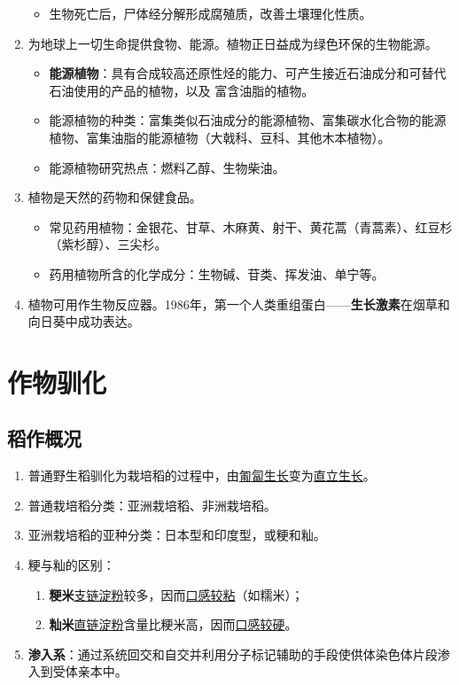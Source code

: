 \begin{enumerate}
\begin{itemize}
        \item 生物死亡后，尸体经分解形成腐殖质，改善土壤理化性质。
    \end{itemize}
    \item 为地球上一切生命提供食物、能源。植物正日益成为绿色环保的生物能源。
    \begin{itemize}
        \item \textbf{能源植物}：具有合成较高还原性烃的能力、可产生接近石油成分和可替代石油使用的产品的植物，以及 富含油脂的植物。
        \item 能源植物的种类：富集类似石油成分的能源植物、富集碳水化合物的能源植物、富集油脂的能源植物（大戟科、豆科、其他木本植物）。
        \item 能源植物研究热点：燃料乙醇、生物柴油。
    \end{itemize}
    \item 植物是天然的药物和保健食品。
    \begin{itemize}
        \item 常见药用植物：金银花、甘草、木麻黄、射干、黄花蒿（青蒿素）、红豆杉（紫杉醇）、三尖杉。
        \item 药用植物所含的化学成分：生物碱、苷类、挥发油、单宁等。
    \end{itemize}
    \item 植物可用作生物反应器。1986年，第一个人类重组蛋白——\textbf{生长激素}在烟草和向日葵中成功表达。
\end{enumerate}

\section{作物驯化}
\subsection{稻作概况}
\begin{enumerate}
    \item 普通野生稻驯化为栽培稻的过程中，由\uline{匍匐生长}变为\uline{直立生长}。
    \item 普通栽培稻分类：亚洲栽培稻、非洲栽培稻。
    \item 亚洲栽培稻的亚种分类：日本型和印度型，或粳和籼。
    \item 粳与籼的区别：
    \begin{enumerate}
        \item \textbf{粳米}\uline{支链淀粉}较多，因而\uline{口感较粘}（如糯米）；
        \item \textbf{籼米}\uline{直链淀粉}含量比粳米高，因而\uline{口感较硬}。
    \end{enumerate}
    \item \textbf{渗入系}：通过系统回交和自交并利用分子标记辅助的手段使供体染色体片段渗入到受体亲本中。
\end{enumerate}

